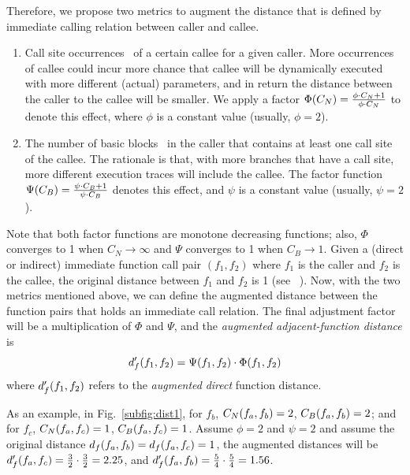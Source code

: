 Therefore, we propose two metrics to augment the distance that is defined by immediate calling relation between caller and callee.
\begin{enumerate}[(1)] 
\item Call site occurrences \csnum~of a certain callee for a given caller. More occurrences of callee could incur more chance that callee will be dynamically executed with more different (actual) parameters, and in return the distance between the caller to the callee will be smaller. We apply a factor $\Phi(C_N)=\frac{\phi\cdot C_N+1}{\phi\cdot C_N}$ to denote this effect, where $\phi$ is a constant value (usually, $\phi=2$).
\item The number of basic blocks \csbb~in the caller that contains at least one call site of the callee. The rationale is that, with more branches that have a call site, more different execution traces will include the callee. The factor function $\Psi(C_B)=\frac{\psi\cdot C_B+1}{\psi\cdot C_B}$ denotes this effect, and $\psi$ is a constant value (usually, $\psi=2$).
\end{enumerate}

Note that both factor functions are monotone decreasing functions; also, $\Phi$ converges to 1 when $C_N\rightarrow\infty$ and $\Psi$ converges to 1 when $C_B\rightarrow 1$.
Given a (direct or indirect) immediate function call pair $( f_1, f_2)$ where $f_1$ is the caller and $f_2$ is the callee, the original distance between $f_1$ and $f_2$ is 1 (see \aflgo~\cite{Bohme:2017:DGF}). Now, with the two metrics mentioned above, we can define the augmented distance between the function pairs that holds an immediate call relation. The final adjustment factor will be a multiplication of $\Phi$ and $\Psi$, and the \emph{augmented adjacent-function distance} is
\begin{equation}
 d^{\prime}_f(f_1,f_2) =  \Psi(f_1, f_2)\cdot\Phi(f_1, f_2)
\end{equation}
where $d^{\prime}_f(f_1,f_2)$ refers to the \emph{augmented} \emph{direct} function distance. 

As an example, in Fig.~\ref{subfig:dist1}, for $f_b$, $C_N(f_a, f_b)=2$, $C_B(f_a, f_b)=2$; and for $f_c$, $C_N(f_a, f_c)=1$, $C_B(f_a, f_c)=1$. Assume $\phi=2$ and $\psi=2$ and assume the original distance $d_f(f_a,f_b)=d_f(f_a,f_c)=1$, the augmented distances will be $d^{\prime}_f(f_a,f_c)=\frac{3}{2}\cdot\frac{3}{2}=2.25$, and $d^{\prime}_f(f_a,f_b)=\frac{5}{4}\cdot\frac{5}{4}=1.56$.


